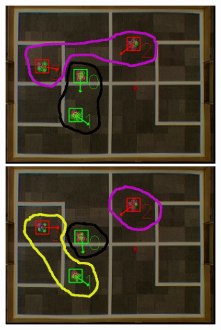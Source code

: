 \documentclass[a4paper,12pt]{article}
\begin{document}
\medskip

\begin{minipage}{0.6\textwidth}
\includegraphics[height=60mm,width=90mm]{filter1.jpg}\newline\newline
\includegraphics[height=60mm,width=90mm]{filter2.jpg}
\end{minipage}
\end{document}
